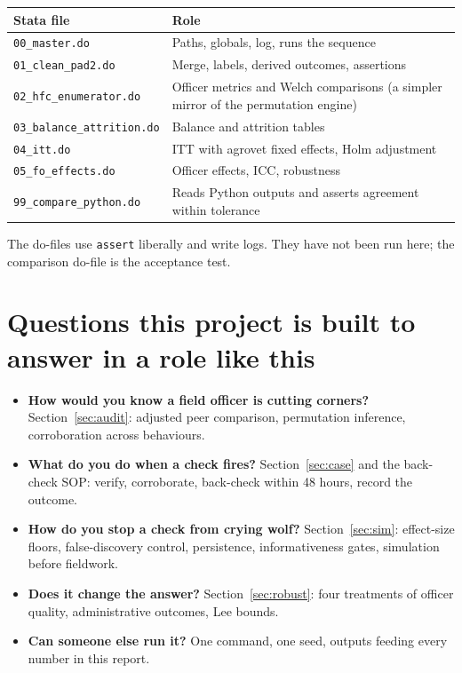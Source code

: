 \documentclass[11pt,a4paper]{article}
\begin{document}
\begin{center}\small\setlength{\tabcolsep}{5pt}\begin{tabular}{p{4.3cm}p{9.7cm}}\toprule Stata file & Role\\\midrule
\texttt{00\_master.do} & Paths, globals, log, runs the sequence\\
\texttt{01\_clean\_pad2.do} & Merge, labels, derived outcomes, assertions\\
\texttt{02\_hfc\_enumerator.do} & Officer metrics and Welch comparisons (a simpler mirror of the permutation engine)\\
\texttt{03\_balance\_attrition.do} & Balance and attrition tables\\
\texttt{04\_itt.do} & ITT with agrovet fixed effects, Holm adjustment\\
\texttt{05\_fo\_effects.do} & Officer effects, ICC, robustness\\
\texttt{99\_compare\_python.do} & Reads Python outputs and asserts agreement within tolerance\\\bottomrule\end{tabular}\end{center}
The do-files use \texttt{assert} liberally and write logs. They have not been run here; the comparison do-file is the acceptance test.

\section{Questions this project is built to answer in a role like this}
\begin{itemize}
\item \textbf{How would you know a field officer is cutting corners?} Section~\ref{sec:audit}: adjusted peer comparison, permutation inference, corroboration across behaviours.
\item \textbf{What do you do when a check fires?} Section~\ref{sec:case} and the back-check SOP: verify, corroborate, back-check within 48 hours, record the outcome.
\item \textbf{How do you stop a check from crying wolf?} Section~\ref{sec:sim}: effect-size floors, false-discovery control, persistence, informativeness gates, simulation before fieldwork.
\item \textbf{Does it change the answer?} Section~\ref{sec:robust}: four treatments of officer quality, administrative outcomes, Lee bounds.
\item \textbf{Can someone else run it?} One command, one seed, outputs feeding every number in this report.
\end{itemize}
\end{document}

